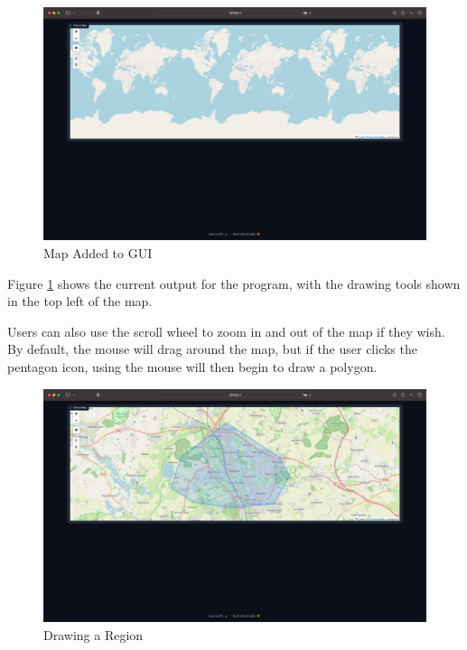 \documentclass[12pt]{report}
\begin{document}
\begin{figure}[H]
\centering
\includegraphics[width=14cm]{ss11.3.png}
\caption{Map Added to GUI}\label{fig:ss11.3}
\end{figure}

Figure \ref{fig:ss11.3} shows the current output for the program, with the drawing tools shown in the top left of the map.

Users can also use the scroll wheel to zoom in and out of the map if they wish. By default, the mouse will drag around the map, but if the user clicks the pentagon icon, using the mouse will then begin to draw a polygon.

\begin{figure}[H]
\centering
\includegraphics[width=14cm]{ss11.4.png}
\caption{Drawing a Region}\label{fig:ss11.4}
\end{figure}

\begin{center}
\end{center}
\end{document}
